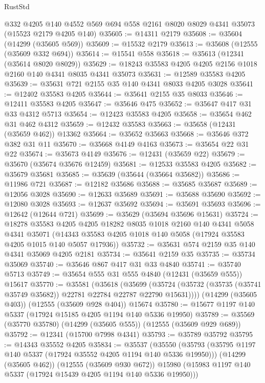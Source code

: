 \begin{lexlean}{RustStd}
\begin{coremodule}
    @332
    @4205
    @140
    @4552
    @569
    @694
    @558
    @2161
    @8020
    @8029
    @4341
    @35073
    (@15523 @2179 @4205 @140)
@35605 := @14311 @2179
@35608 := @35604 (@14299 (@35605 @569))
@35609 := @15532 @2179
@35613 := @35608 (@12555 (@35609 @332 @694))
@35614 := @15541 @558
@35618 := @35613 (@12341 (@35614 @8020 @8029))
@35629 := @18243 @35583 @4205 @4205 @2156 @1018 @2160 @140 @4341 @8035 @4341 @35073
@35631 := @12589 @35583 @4205
@35639 := @35631 @721 @2155 @35 @140 @4341 @8033 @4205 @3028
@35641 := @12402 @35583 @4205
@35644 := @35641 @2155 @35 @8033
@35646 := @12411 @35583 @4205
@35647 := @35646 @475
@35652 := @35647 @417 @31 @33 @4312 @5713
@35654 := @12423 @35583 @4205
@35658 := @35654 @462 @31 @462 @4312
@35659 := @12432 @35583
@35663 := @35658 (@12431 (@35659 @462)) @13362
@35664 := @35652 @35663
@35668 := @35646 @372 @382 @31 @11
@35670 := @35668 @4149 @4163
@35673 := @35654 @22 @31 @22
@35674 := @35673 @4149
@35676 := @12431 (@35659 @22)
@35679 := @35670 (@35674 @35676 @12459)
@35681 := @12533 @35583 @4205
@35682 := @35679 @35681
@35685 := @35639 (@35644 (@35664 @35682))
@35686 := @11986 @721
@35687 := @12182 @35686
@35688 := @35685 @35687
@35689 := @12056 @3028
@35690 := @12633 @35689
@35691 := @35688 @35690
@35692 := @12080 @3028
@35693 := @12637 @35692
@35694 := @35691 @35693
@35696 := @12642 (@12644 @721)
@35699 := @35629 (@35694 @35696 @15631)
@35724 := @18278
    @35583
    @4205
    @4205
    @18282
    @8035
    @1018
    @2160
    @140
    @4341
    @5058
    @4341
    @35071
    (@14343 @35583 @4205 @1018 @140 @5058 (@17924 @35583 @4205 @1015 @140 @5057 @17936))
@35732 := @35631 @574 @2159 @35 @140 @4341 @35069 @4205 @2181
@35734 := @35641 @2159 @35
@35735 := @35734 @35069
@35740 := @35646 @867 @417 @31 @33 @4840
@35741 := @35740 @5713
@35749 := @35654 @555 @31 @555 @4840 (@12431 (@35659 @555)) @15617
@35770 := @35581
    (@35618
      (@35699 (@35724 (@35732 (@35735 (@35741 @35749 @35682)) @22781 @22784 @22787 @22790 @15631))))
    (@14299 (@35605 @403))
    (@12555 (@35609 @928 @404))
    @15674
@35780 := @15677 @1197 @140 @5337 (@17924 @15185 @4205 @1194 @140 @5336 @19950)
@35789 := @35569 (@35770 @35780) (@14299 (@35605 @555)) (@12555 (@35609 @929 @689))
@35792 := @12341 (@15700 @7998 @4341)
@35793 := @35789 @35792
@35795 := @14343 @35552 @4205
@35834 := @35537
    (@35550
      (@35793 (@35795 @1197 @140 @5337 (@17924 @35552 @4205 @1194 @140 @5336 @19950)))
      (@14299 (@35605 @462))
      (@12555 (@35609 @930 @672))
      @15980
      (@15983 @1197 @140 @5337 (@17924 @15439 @4205 @1194 @140 @5336 @19950)))

\end{coremodule}
\end{lexlean}
